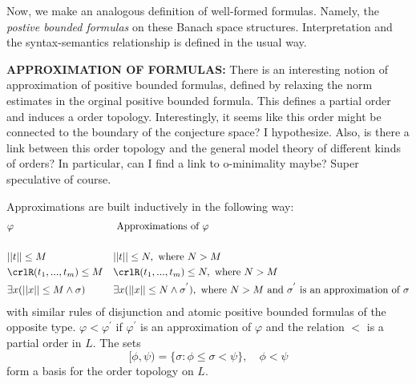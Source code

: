 
Now, we make an analogous definition of well-formed formulas. Namely, the \textit{postive bounded formulas} on these Banach space structures. Interpretation and the syntax-semantics
relationship is defined in the usual way.

\begin{remark}
    \textbf{APPROXIMATION OF FORMULAS: } There is an interesting notion of approximation of positive bounded formulas, defined by relaxing the norm estimates in the orginal positive bounded formula.
    This defines a partial order and induces a order topology. Interestingly, it seems like this order might be connected to the boundary of the conjecture space? I hypothesize. Also, is there a link between this order topology
    and the general model theory of different kinds of orders? In particular, can I find a link to o-minimality maybe? Super speculative of course.
\end{remark}

Approximations are built inductively in the following way:
\begin{align*}
    & \varphi & & \text{ Approximations of }\varphi\\\\
    & ||t||\leq M & & ||t||\leq N, \text{ where } N > M\\
    & \crlR(t_1,...,t_m)\leq M & & \crlR(t_1,...,t_m)\leq N, \text{ where } N > M\\
    & \exists x(||x||\leq M \wedge \sigma) & & \exists x(||x||\leq N \wedge \sigma^{'}), \text{ where } N > M \text{ and } \sigma^{'} \text{ is an approximation of }\sigma
\end{align*}
with similar rules of disjunction and atomic positive bounded formulas of the opposite type. $\varphi < \varphi^{'}$ if $\varphi^{'}$ is an approximation of $\varphi$ and the relation $ < $ is a partial order in $L$. The sets
\begin{equation*}
    [\phi, \psi) = \{\sigma : \phi \leq \sigma < \psi\}, \quad \phi < \psi
\end{equation*}
form a basis for the order topology on $L$.

